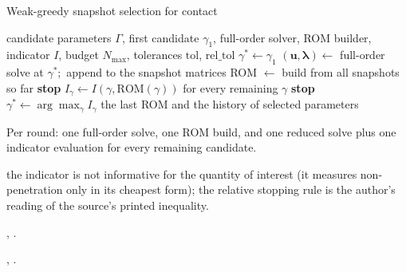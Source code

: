 \begin{algbox}{Weak-greedy snapshot selection for contact}
\begin{pseudo}
\Require candidate parameters $\Gamma$, first candidate $\gamma_1$, full-order solver, ROM builder, indicator $I$, budget $N_{\max}$, tolerances $\mathrm{tol}$, $\mathrm{rel\_tol}$
\State $\gamma^\ast\gets\gamma_1$
  \State $(\bm u,\bm\lambda)\gets$ full-order solve at $\gamma^\ast$;\ append to the snapshot matrices
  \State ROM $\gets$ build from all snapshots so far
   \textbf{stop} \EndIf
  \State $I_\gamma\gets I(\gamma,\mathrm{ROM}(\gamma))$ for every remaining $\gamma$ 
   \textbf{stop} \EndIf
  \State $\gamma^\ast\gets\arg\max_\gamma I_\gamma$
\EndFor
\Ensure the last ROM and the history of selected parameters
\end{pseudo}
\begin{algdet}
\item[Cost] Per round: one full-order solve, one ROM build, and one reduced solve plus one indicator evaluation for every remaining candidate.
\item[Fails when] the indicator is not informative for the quantity of interest (it measures non-penetration only in its cheapest form); the relative stopping rule is the author's reading of the source's printed inequality.
\item[Code] , .
\item[Verified in] , .
\end{algdet}
\end{algbox}


